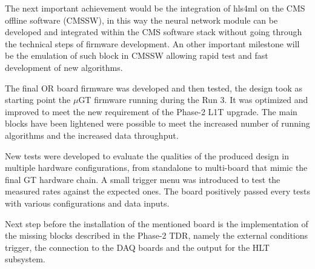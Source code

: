 \documentclass[../../main.tex]{subfiles}
\begin{document}
The next important achievement would be the integration of hls4ml on the CMS offline software (CMSSW), in this way the neural network module can be developed and integrated within the CMS software stack without going through the technical steps of firmware development. An other important milestone will be the emulation of such block in CMSSW allowing rapid test and fast development of new algorithms. 


The final OR board firmware was developed and then tested, the design took as starting point the $\mu$GT firmware running during the Run 3. It was optimized and improved to meet the new requirement of the Phase-2 L1T upgrade. The main blocks have been lightened were possible to meet the increased number of running algorithms and the increased data throughput.  

New tests were developed to evaluate the qualities of the produced design in multiple hardware configurations, from standalone to multi-board that mimic the final GT hardware chain. A small trigger menu was introduced to test the measured rates against the expected ones. The board positively passed every tests with various configurations and data inputs.

Next step before the installation of the mentioned board is the implementation of the missing blocks described in the Phase-2 TDR\cite{L1T-2up}, namely the external conditions trigger, the connection to the DAQ boards and the output for the HLT subsystem.


    
\end{document}
